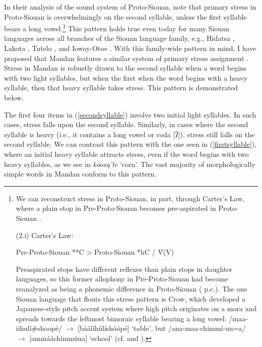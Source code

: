 In their analysis of the sound system of Proto-Siouan, \citet{rankinetalnd} note that primary stress in Proto-Siouan is overwhelmingly on the second syllable, unless the first syllable bears a long vowel.\footnote{We can reconstruct stress in Proto-Siouan, in part, through Carter's Law, where a plain stop in Pre-Proto-Siouan becomes pre-aspirated in Proto-Siouan \citep{rankinetalnd}.

\begin{exe}
\item[(2.i)] Carter's Law:

	Pre-Proto-Siouan **C > Proto-Siouan *hC / {\longrule}V́(V)

\end{exe}

Preaspirated stops have different reflexes than plain stops in daughter languages, so this former allophony in Pre-Proto-Siouan had become reanalyzed as being a phonemic difference in Proto-Siouan (\citeauthor{rankin2010} p.c.). The one Siouan language that flouts this stress pattern is Crow, which developed a Japanese-style pitch accent system where high pitch originates on a mora and spreads towards the leftmost bimoraic syllable bearing a long vowel: /maa-iihulí\#shoopé/ $\to$ [bááííhúlíshóópé] `table', but /ana-maa-chimmí-uu=a/ $\to$ [ammááchímmúua] `school' (cf. \citealt{graczyk2007} and \citealt{wallace1993}).} This pattern holds true even today for many Siouan languages across all branches of the Siouan language family, e.g., Hidatsa \citep{boyleetal2016}, Lakota \citep{boasdeloria1941}, Tutelo \citep{oliverio1997}, and Ioway-Otoe \citep{whitman1947}. With this family-wide pattern in mind, I have proposed that Mandan features a similar system of primary stress assignment \citep{kasakqp1}. Stress in Mandan is robustly drawn to the second syllable when a word begins with two light syllables, but when the first when the word begins with a heavy syllable, then that heavy syllable takes stress. This pattern is demonstrated below.

The first four items in (\ref{secondsyllable}) involve two initial light syllables. In such cases, stress falls upon the second syllable. Similarly, in cases where the second syllable is heavy (i.e., it contains a long vowel or coda [ʔ]), stress still falls on the second syllable. We can contrast this pattern with the one seen in (\ref{firstsyllable}), where an initial heavy syllable attracts stress, even if the word begins with two heavy syllables, as we see in \textit{kóoxą'te} `corn'. The vast majority of morphologically simple words in Mandan conform to this pattern.

